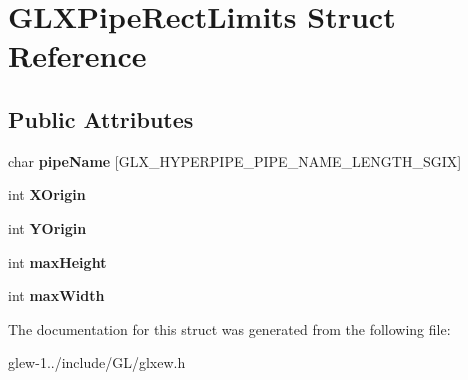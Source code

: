 \hypertarget{struct_g_l_x_pipe_rect_limits}{\section{G\-L\-X\-Pipe\-Rect\-Limits Struct Reference}
\label{struct_g_l_x_pipe_rect_limits}
}
\subsection*{Public Attributes}
\begin{DoxyCompactItemize}
\item 
\hypertarget{struct_g_l_x_pipe_rect_limits_ae78b4b6656101bc841946733a5b6e5ce}{char {\bfseries pipe\-Name} \mbox{[}G\-L\-X\-\_\-\-H\-Y\-P\-E\-R\-P\-I\-P\-E\-\_\-\-P\-I\-P\-E\-\_\-\-N\-A\-M\-E\-\_\-\-L\-E\-N\-G\-T\-H\-\_\-\-S\-G\-I\-X\mbox{]}}\label{struct_g_l_x_pipe_rect_limits_ae78b4b6656101bc841946733a5b6e5ce}

\item 
\hypertarget{struct_g_l_x_pipe_rect_limits_a3e5a965059d9f5d2ca42acd35af5bb9b}{int {\bfseries X\-Origin}}\label{struct_g_l_x_pipe_rect_limits_a3e5a965059d9f5d2ca42acd35af5bb9b}

\item 
\hypertarget{struct_g_l_x_pipe_rect_limits_a50e06bcf0dae95854be7d93a515199e9}{int {\bfseries Y\-Origin}}\label{struct_g_l_x_pipe_rect_limits_a50e06bcf0dae95854be7d93a515199e9}

\item 
\hypertarget{struct_g_l_x_pipe_rect_limits_a27572e499c0d3280031c2ad8e387c0c1}{int {\bfseries max\-Height}}\label{struct_g_l_x_pipe_rect_limits_a27572e499c0d3280031c2ad8e387c0c1}

\item 
\hypertarget{struct_g_l_x_pipe_rect_limits_a8662c7a712b30620e25fc994adf337a1}{int {\bfseries max\-Width}}\label{struct_g_l_x_pipe_rect_limits_a8662c7a712b30620e25fc994adf337a1}

\end{DoxyCompactItemize}


The documentation for this struct was generated from the following file\-:\begin{DoxyCompactItemize}
\item 
glew-\/1../include/\-G\-L/glxew.\-h\end{DoxyCompactItemize}
